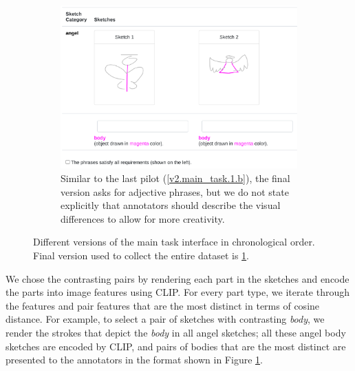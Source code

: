 \begin{figure}[!h]
\ContinuedFloat
\begin{subfigure}{\textwidth}
\centering
\includegraphics[width=.8\linewidth]{data_collection/version2/v2anno.png}  
\caption{Similar to the last pilot (\ref{v2.main_task.1.b}), the final version asks for adjective phrases, but we do not state explicitly that annotators should describe the visual differences to allow for more creativity.}
\label{v2.main_task.1.d}
\end{subfigure}
\caption{Different versions of the main task interface in chronological order. Final version used to collect the entire dataset is \ref{v2.main_task.1.d}.}
\label{v2.main_task.1}
\end{figure}

We chose the contrasting pairs by rendering each part in the sketches and encode the parts into image features using CLIP. For every part type, we iterate through the features and pair features that are the most distinct in terms of cosine distance. For example, to select a pair of sketches with contrasting \textit{body}, we render the strokes that depict the \textit{body} in all angel sketches; all these angel body sketches are encoded by CLIP, and pairs of bodies that are the most distinct are presented to the annotators in the format shown in Figure \ref{v2.main_task.1.d}.  
  

